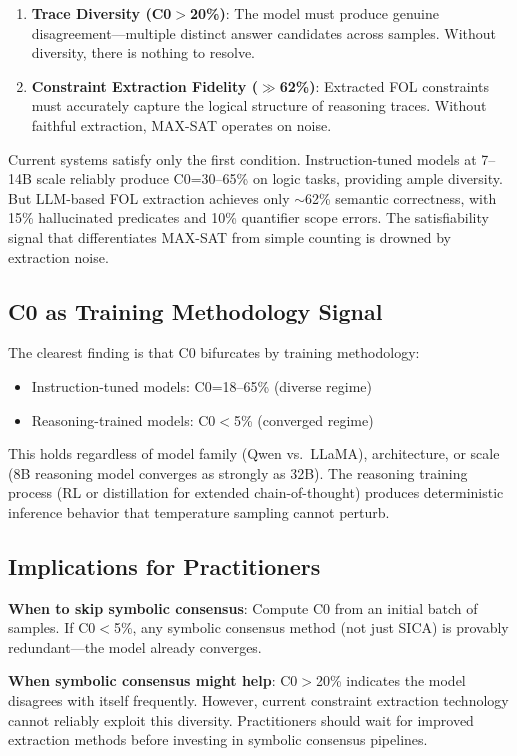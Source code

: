 \documentclass[11pt,a4paper]{article}
\begin{document}
\begin{enumerate}
\item \textbf{Trace Diversity (C0$>$20\%)}: The model must produce genuine disagreement---multiple distinct answer candidates across samples. Without diversity, there is nothing to resolve.
\item \textbf{Constraint Extraction Fidelity ($\gg$62\%)}: Extracted FOL constraints must accurately capture the logical structure of reasoning traces. Without faithful extraction, MAX-SAT operates on noise.
\end{enumerate}

Current systems satisfy only the first condition. Instruction-tuned models at 7--14B scale reliably produce C0=30--65\% on logic tasks, providing ample diversity. But LLM-based FOL extraction achieves only $\sim$62\% semantic correctness, with 15\% hallucinated predicates and 10\% quantifier scope errors. The satisfiability signal that differentiates MAX-SAT from simple counting is drowned by extraction noise.

\subsection{C0 as Training Methodology Signal}

The clearest finding is that C0 bifurcates by training methodology:
\begin{itemize}
\item Instruction-tuned models: C0=18--65\% (diverse regime)
\item Reasoning-trained models: C0$<$5\% (converged regime)
\end{itemize}

This holds regardless of model family (Qwen vs.\ LLaMA), architecture, or scale (8B reasoning model converges as strongly as 32B). The reasoning training process (RL or distillation for extended chain-of-thought) produces deterministic inference behavior that temperature sampling cannot perturb.

\subsection{Implications for Practitioners}

\textbf{When to skip symbolic consensus}: Compute C0 from an initial batch of samples. If C0$<$5\%, any symbolic consensus method (not just SICA) is provably redundant---the model already converges.

\textbf{When symbolic consensus might help}: C0$>$20\% indicates the model disagrees with itself frequently. However, current constraint extraction technology cannot reliably exploit this diversity. Practitioners should wait for improved extraction methods before investing in symbolic consensus pipelines.
\end{document}
